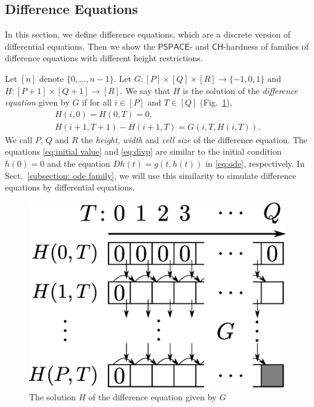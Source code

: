\documentclass{lmcs}
\theoremstyle{definition}
\theoremstyle{remark}
\newcommand{\D}{D}
\newcommand{\classPSPACE}{\mathsf{PSPACE}}
\newcommand{\classCH}{\mathsf{CH}}
\begin{document}
\subsection{Difference Equations}
\label{section:divp}

In this section, we define difference equations, 
which are a discrete version of differential equations. 
Then we show the $\classPSPACE$- and $\classCH$-hardness of 
families of difference equations with different height restrictions. 

Let $[n]$ denote $\{0, \dots , n-1\}$.
Let $G \colon [P] \times [Q] \times [R] \to \{-1, 0, 1\}$ and
$H \colon [P + 1] \times [Q+1] \to [R]$. 
We say that $H$ is the solution of the \emph{difference equation} given by $G$
if for all $i \in [P]$ and $T \in [Q]$ (Fig.~\ref{fig:divp}), 
\begin{gather}
   H(i, 0) = H(0, T) = 0, \label{eq:initial value}
\\
   H(i + 1, T + 1) - H(i+1, T) = G(i, T, H(i, T)).  \label{eq:divp}
\end{gather}
We call $P$, $Q$ and $R$ the \emph{height}, \emph{width} and \emph{cell size} of
the difference equation.
The equations \eqref{eq:initial value} and \eqref{eq:divp} are similar to 
the initial condition $h(0) = 0$ and the equation $\D h(t) = g(t, h(t))$ 
in \eqref{eq:ode}, respectively.
In Sect.~\ref{subsection: ode family}, 
we will use this similarity to simulate difference equations by differential equations.

\begin{figure}
 \begin{center}
  \includegraphics[height=0.15\textheight]{image/divp.eps}
 \end{center}
 \caption{The solution $H$ of the difference equation given by $G$}
 \label{fig:divp}
\end{figure}
\end{document}
